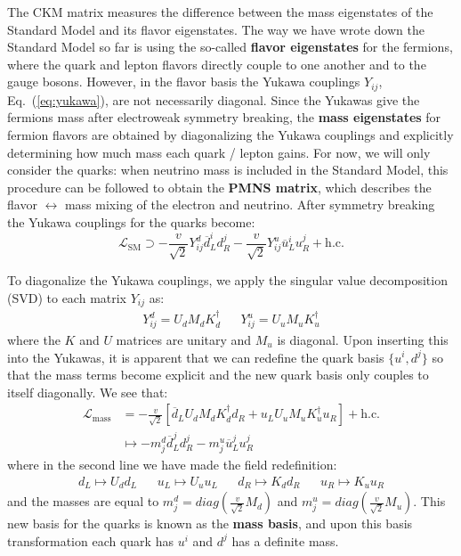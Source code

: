 \documentclass[11pt, oneside]{article}   	%
\theoremstyle{definition}
\numberwithin{equation}{subsection}		%
\begin{document}
The CKM matrix measures the difference between the mass eigenstates of the Standard Model and its flavor eigenstates. The way we have 
wrote down the Standard Model so far is using the so-called \textbf{flavor eigenstates} for the fermions, where the quark and lepton flavors 
directly couple to one another and to the gauge bosons. However, in the flavor basis the Yukawa couplings $Y_{ij}$, Eq.~(\ref{eq:yukawa}), 
are not necessarily diagonal. Since the Yukawas give the fermions mass after electroweak symmetry breaking, the \textbf{mass eigenstates}
for fermion flavors are obtained by diagonalizing the Yukawa couplings and explicitly determining how much mass each quark / lepton gains. 
For now, we will only consider the quarks: when neutrino mass is included in the Standard Model, this procedure can be followed to 
obtain the \textbf{PMNS matrix}, which describes the flavor $\leftrightarrow$ mass mixing of the electron and neutrino. After symmetry 
breaking the Yukawa couplings for the quarks become:
\begin{equation}
	\mathcal L_\mathrm{SM}\supset - \frac{v}{\sqrt 2} Y_{ij}^d \overline d_L^i d_R^j - \frac{v}{\sqrt 2} Y_{ij}^u \overline u_L^i u_R^j + \mathrm{h.c.}
\end{equation}

To diagonalize the Yukawa couplings, we apply the singular value decomposition (SVD) to each matrix $Y_{ij}$ as:
\begin{align}
	Y_{ij}^d = U_d M_d K_d^\dagger && Y_{ij}^u = U_u M_u K_u^\dagger
\end{align}
where the $K$ and $U$ matrices are unitary and $M_u$ is diagonal. Upon inserting this into the Yukawas, it is apparent that we can 
redefine the quark basis $\{u^i, d^j\}$ so that the mass terms become explicit and the new quark basis only couples to itself 
diagonally. We see that:
\begin{align}
	\mathcal L_\mathrm{mass} &= - \frac{v}{\sqrt 2} \left[ \overline d_L U_d M_d K_d^\dagger d_R + u_L U_u M_u K_u^\dagger u_R  \right]
	+ \mathrm{h.c.} \\
	&\mapsto -m_j^d \overline{d}_L^{j} d_R^j - m_j^u \overline u_L^j u_R^j
\end{align}
where in the second line we have made the field redefinition:
\begin{align}
	d_L\mapsto U_d d_L && u_L\mapsto U_u u_L && d_R\mapsto K_d d_R && u_R\mapsto K_u u_R
\end{align}
and the masses are equal to $m_j^d = diag(\frac{v}{\sqrt 2} M_d)$ and $m_j^u = diag(\frac{v}{\sqrt 2} M_u)$. This new basis for the 
quarks is known as the \textbf{mass basis}, and upon this basis transformation each quark has $u^i$ and $d^j$ has a definite mass. 
\end{document}
